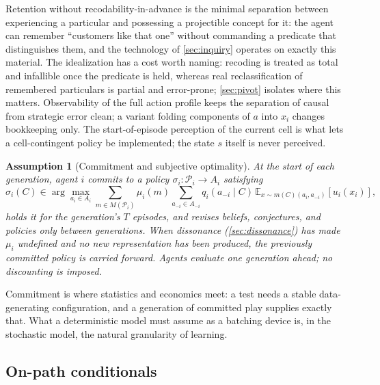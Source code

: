 \documentclass[11pt]{article}
\newtheorem{assumption}{Assumption}[section]
\theoremstyle{definition}
\begin{document}
Retention without recodability-in-advance is the minimal separation between
experiencing a particular and possessing a projectible concept for it: the
agent can remember ``customers like that one'' without commanding a predicate
that distinguishes them, and the technology of \cref{sec:inquiry} operates on
exactly this material.  The idealization has a cost worth naming: recoding is
treated as total and infallible once the predicate is held, whereas real
reclassification of remembered particulars is partial and error-prone;
\cref{sec:pivot} isolates where this matters.  Observability of the full
action profile keeps the separation of causal from strategic error clean; a
variant folding components of $a$ into $x_i$ changes bookkeeping only.  The
start-of-episode perception of the current cell is what lets a cell-contingent
policy be implemented; the state $s$ itself is never perceived.

\begin{assumption}[Commitment and subjective optimality]
\label{ass:commitment}
At the start of each generation, agent $i$ commits to a policy
$\sigma_i:\mathcal P_i\to A_i$ satisfying
\begin{equation}
\sigma_i(C)\in\arg\max_{a_i\in A_i}
\sum_{m\in M(\mathcal P_i)}\mu_i(m)
\sum_{a_{-i}\in A_{-i}}q_i(a_{-i}\mid C)\,
\mathbb E_{x\sim m(C)(a_i,a_{-i})}\!\left[u_i(x_i)\right],
\label{eq:subjective-optimality}
\end{equation}
holds it for the generation's $T$ episodes, and revises beliefs, conjectures,
and policies only between generations.  When dissonance
(\cref{sec:dissonance}) has made $\mu_i$ undefined and no new representation
has been produced, the previously committed policy is carried forward.
Agents evaluate one generation ahead; no discounting is imposed.
\end{assumption}

Commitment is where statistics and economics meet: a test needs a stable
data-generating configuration, and a generation of committed play supplies
exactly that.  What a deterministic model must assume as a batching device
is, in the stochastic model, the natural granularity of learning.

\subsection{On-path conditionals}
\end{document}
